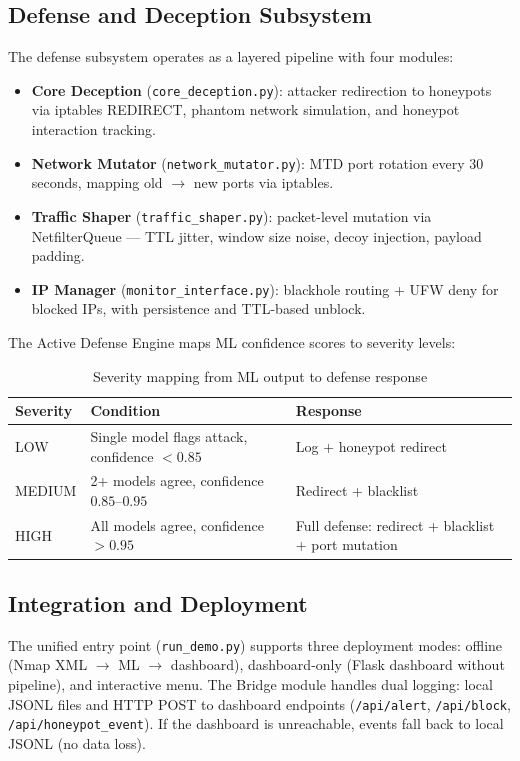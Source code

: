 \documentclass[12pt,a4paper]{report}
\begin{document}
\subsection{Defense and Deception Subsystem}

The defense subsystem operates as a layered pipeline with four modules:

\begin{itemize}
    \item \textbf{Core Deception} (\texttt{core\_deception.py}): attacker redirection to honeypots via iptables REDIRECT, phantom network simulation, and honeypot interaction tracking.
    \item \textbf{Network Mutator} (\texttt{network\_mutator.py}): MTD port rotation every 30 seconds, mapping old $\to$ new ports via iptables.
    \item \textbf{Traffic Shaper} (\texttt{traffic\_shaper.py}): packet-level mutation via NetfilterQueue --- TTL jitter, window size noise, decoy injection, payload padding.
    \item \textbf{IP Manager} (\texttt{monitor\_interface.py}): blackhole routing + UFW deny for blocked IPs, with persistence and TTL-based unblock.
\end{itemize}

The Active Defense Engine maps ML confidence scores to severity levels:

\begin{table}[H]
\centering
\caption{Severity mapping from ML output to defense response}
\label{tab:severity}
\begin{tabular}{l l p{5cm}}
\toprule
\textbf{Severity} & \textbf{Condition} & \textbf{Response} \\
\midrule
LOW & Single model flags attack, confidence $< 0.85$ & Log + honeypot redirect \\
MEDIUM & 2+ models agree, confidence $0.85$--$0.95$ & Redirect + blacklist \\
HIGH & All models agree, confidence $> 0.95$ & Full defense: redirect + blacklist + port mutation \\
\bottomrule
\end{tabular}
\end{table}

\subsection{Integration and Deployment}\label{sec:integration}

The unified entry point (\texttt{run\_demo.py}) supports three deployment modes: offline (Nmap XML $\to$ ML $\to$ dashboard), dashboard-only (Flask dashboard without pipeline), and interactive menu. The Bridge module handles dual logging: local JSONL files and HTTP POST to dashboard endpoints (\texttt{/api/alert}, \texttt{/api/block}, \texttt{/api/honeypot\_event}). If the dashboard is unreachable, events fall back to local JSONL (no data loss).
\end{document}
